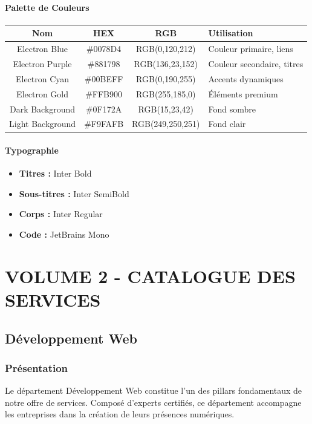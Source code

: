 \documentclass[12pt,a4paper,oneside]{book}
\begin{document}
\subsection{Palette de Couleurs}
\bigskip
\begin{center}
\begin{tabular}{|c|c|c|p{5cm}|}
\hline
\rowcolor{electronblue}
\color{white}\textbf{Nom} & \color{white}\textbf{HEX} & \color{white}\textbf{RGB} & \color{white}\textbf{Utilisation} \\
\hline
Electron Blue & \#0078D4 & RGB(0,120,212) & Couleur primaire, liens \\
\hline
Electron Purple & \#881798 & RGB(136,23,152) & Couleur secondaire, titres \\
\hline
Electron Cyan & \#00BEFF & RGB(0,190,255) & Accents dynamiques \\
\hline
Electron Gold & \#FFB900 & RGB(255,185,0) & Éléments premium \\
\hline
Dark Background & \#0F172A & RGB(15,23,42) & Fond sombre \\
\hline
Light Background & \#F9FAFB & RGB(249,250,251) & Fond clair \\
\hline
\end{tabular}
\end{center}

\subsection{Typographie}
\begin{itemize}
\item \textbf{Titres :} Inter Bold
\item \textbf{Sous-titres :} Inter SemiBold
\item \textbf{Corps :} Inter Regular
\item \textbf{Code :} JetBrains Mono
\end{itemize}

\part{VOLUME 2 - CATALOGUE DES SERVICES}

\chapter{Développement Web}

\section{Présentation}
Le département Développement Web constitue l'un des pillars fondamentaux de notre offre de services. Composé d'experts certifiés, ce département accompagne les entreprises dans la création de leurs présences numériques.
\end{document}
